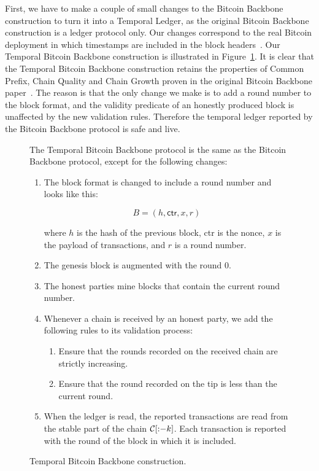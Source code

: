 First, we have to make a couple of small changes to the Bitcoin Backbone construction to turn it
into a Temporal Ledger, as the original Bitcoin Backbone construction is a ledger protocol only.
Our changes correspond to the real Bitcoin deployment in which timestamps are included in the block
headers~\cite{mastering-bitcoin}.
Our Temporal Bitcoin Backbone construction is illustrated in Figure~\ref{fig.temporal-backbone}.
It is clear that the Temporal Bitcoin Backbone construction retains the properties of Common Prefix,
Chain Quality and Chain Growth proven in the original Bitcoin Backbone paper~\cite{backbone}.
The reason is that the only change we make is to add a round number to the block format, and
the validity predicate of an honestly produced block is unaffected by the new validation rules.
Therefore the temporal ledger reported by the Bitcoin Backbone protocol is safe and live.

\begin{figure}

  The Temporal Bitcoin Backbone protocol is the same as the Bitcoin Backbone protocol, except
  for the following changes:

  \begin{enumerate}
    \item The block format is changed to include a round number and looks like this:

    \[
      B = (h, \textsf{ctr}, x, r)
    \]

    where $h$ is the hash of the previous block, \textsf{ctr} is the nonce, $x$ is the
    payload of transactions, and $r$ is a round number.

    \item The genesis block is augmented with the round $0$.
    \item The honest parties mine blocks that contain the current round number.
    \item Whenever a chain is received by an honest party, we add the following rules to
          its validation process:

          \begin{enumerate}
            \item Ensure that the rounds recorded on the received chain are strictly
                  increasing.
            \item Ensure that the round recorded on the tip is less than the current round.
          \end{enumerate}
    \item When the ledger is \textsf{read}, the reported transactions are read from the
          stable part of the chain $\mathcal{C}[{:}{-k}]$. Each transaction is reported with the
          round of the block in which it is included.
  \end{enumerate}
  \caption{Temporal Bitcoin Backbone construction.}
  \label{fig.temporal-backbone}
\end{figure}

